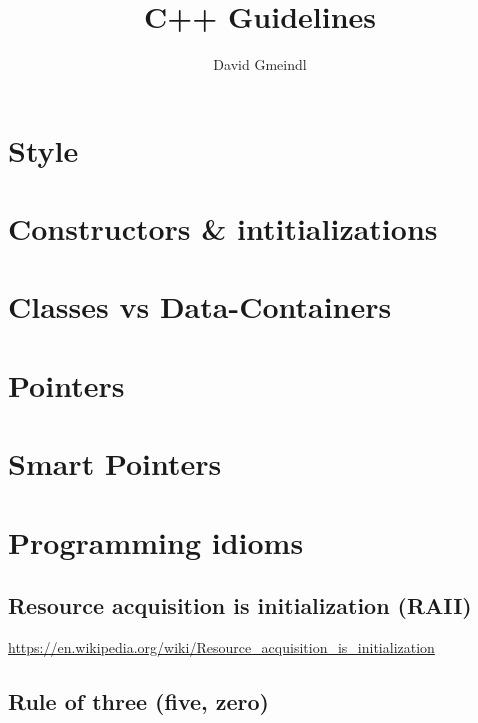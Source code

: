 \documentclass[
10pt,
a4paper,
parskip=half,	%
DIV=0,			%
BCOR=10mm
]{scrartcl}
\author{David Gmeindl}
\title{C++ Guidelines}
\begin{document}
	
	
	\pagestyle{empty}
	\maketitle
	\tableofcontents
	\thispagestyle{empty}
	
	\newpage
	\pagebreak
	
	\pagestyle{scrheadings}
	
\section{Style}

	
\section{Constructors \& intitializations}
	

	
\section{Classes vs Data-Containers}
	
\pagebreak
\section{Pointers}

	
\section{Smart Pointers}
	
\section{Programming idioms} 
\label{sec:programming-idioms}
	\subsection{Resource acquisition is initialization (RAII)}
	
	\url{https://en.wikipedia.org/wiki/Resource_acquisition_is_initialization}
	
	\subsection{Rule of three (five, zero)}
	\label{subsec:rule-of-three}
	
\end{document}
